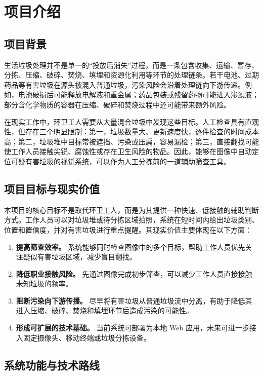 \documentclass[UTF8,a4paper,12pt]{ctexart}
\begin{document}
\newpage
\tableofcontents
\newpage

\section{项目介绍}

\subsection{项目背景}

生活垃圾处理并不是单一的“投放后消失”过程，而是一条包含收集、运输、暂存、分拣、压缩、破碎、焚烧、填埋和资源化利用等环节的处理链条。若干电池、过期药品等有害垃圾在源头被混入普通垃圾，污染风险会沿着处理链向下游传递。例如，电池破损后可能释放电解液和重金属；药品包装或残留药物可能进入渗滤液；部分含化学物质的容器在压缩、破碎和焚烧过程中还可能带来额外风险。

在现实工作中，环卫工人需要从大量混合垃圾中发现这些目标。人工检查具有直观性，但存在三个明显限制：第一，垃圾数量大、更新速度快，逐件检查的时间成本高；第二，垃圾堆中目标常被遮挡、污染或压扁，容易漏检；第三，直接翻找可能使工作人员接触尖锐、腐蚀性或存在卫生风险的物品。因此，能够在图像中自动定位可疑有害垃圾的视觉系统，可以作为人工分拣前的一道辅助筛查工具。

\subsection{项目目标与现实价值}

本项目的核心目标不是取代环卫工人，而是为其提供一种快速、低接触的辅助判断方式。工作人员可以对垃圾堆或待分拣区域拍照，系统在短时间内给出垃圾类别、位置和置信度，并对有害垃圾进行重点提醒。其现实价值主要体现在以下方面：

\begin{enumerate}
  \item \textbf{提高筛查效率。} 系统能够同时检查图像中的多个目标，帮助工作人员优先关注疑似有害垃圾区域，减少盲目翻找。
  \item \textbf{降低职业接触风险。} 先通过图像完成初步筛查，可以减少工作人员直接接触未知垃圾的频率。
  \item \textbf{阻断污染向下游传播。} 尽早将有害垃圾从普通垃圾流中分离，有助于降低其进入压缩、破碎、焚烧和填埋环节后造成污染的可能性。
  \item \textbf{形成可扩展的技术基础。} 当前系统可部署为本地 Web 应用，未来可进一步接入固定摄像头、移动终端或垃圾分拣设备。
\end{enumerate}

\subsection{系统功能与技术路线}
\end{document}
